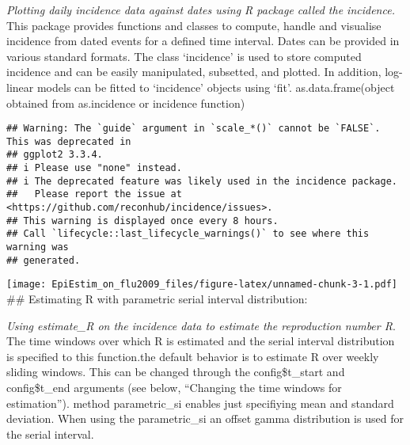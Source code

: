 \documentclass[
]{article}
\newenvironment{Shaded}{\begin{snugshade}}{\end{snugshade}}
\newcommand{\AttributeTok}[1]{\textcolor[rgb]{0.13,0.29,0.53}{#1}}
\newcommand{\FloatTok}[1]{\textcolor[rgb]{0.00,0.00,0.81}{#1}}
\newcommand{\FunctionTok}[1]{\textcolor[rgb]{0.13,0.29,0.53}{\textbf{#1}}}
\newcommand{\NormalTok}[1]{#1}
\newcommand{\OtherTok}[1]{\textcolor[rgb]{0.56,0.35,0.01}{#1}}
\newcommand{\SpecialCharTok}[1]{\textcolor[rgb]{0.81,0.36,0.00}{\textbf{#1}}}
\newcommand{\StringTok}[1]{\textcolor[rgb]{0.31,0.60,0.02}{#1}}
\begin{document}
\emph{Plotting daily incidence data against dates using R package called
the incidence.} This package provides functions and classes to compute,
handle and visualise incidence from dated events for a defined time
interval. Dates can be provided in various standard formats. The class
`incidence' is used to store computed incidence and can be easily
manipulated, subsetted, and plotted. In addition, log-linear models can
be fitted to `incidence' objects using `fit'. as.data.frame(object
obtained from as.incidence or incidence function)

\begin{Shaded}
\end{Shaded}

\begin{verbatim}
## Warning: The `guide` argument in `scale_*()` cannot be `FALSE`. This was deprecated in
## ggplot2 3.3.4.
## i Please use "none" instead.
## i The deprecated feature was likely used in the incidence package.
##   Please report the issue at <https://github.com/reconhub/incidence/issues>.
## This warning is displayed once every 8 hours.
## Call `lifecycle::last_lifecycle_warnings()` to see where this warning was
## generated.
\end{verbatim}

\texttt{[image: EpiEstim\_on\_flu2009\_files/figure-latex/unnamed-chunk-3-1.pdf]}
\#\# Estimating R with parametric serial interval distribution:

\emph{Using estimate\_R on the incidence data to estimate the
reproduction number R}. The time windows over which R is estimated and
the serial interval distribution is specified to this function.the
default behavior is to estimate R over weekly sliding windows. This can
be changed through the config\$t\_start and config\$t\_end arguments
(see below, ``Changing the time windows for estimation''). method
parametric\_si enables just specifiying mean and standard deviation.
When using the parametric\_si an offset gamma distribution is used for
the serial interval.

\begin{Shaded}
\end{Shaded}
\end{document}
